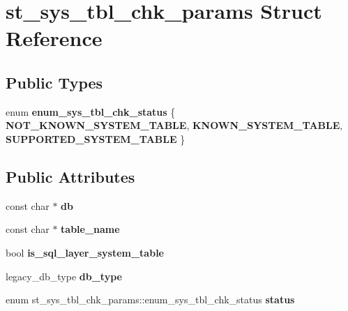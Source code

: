 \hypertarget{structst__sys__tbl__chk__params}{}\section{st\+\_\+sys\+\_\+tbl\+\_\+chk\+\_\+params Struct Reference}
\label{structst__sys__tbl__chk__params}
\subsection*{Public Types}
\begin{DoxyCompactItemize}
\item 
\mbox{\label{structst__sys__tbl__chk__params_a12daaf44c5b629c37691aa6ca2d1e109}} 
enum {\bfseries enum\+\_\+sys\+\_\+tbl\+\_\+chk\+\_\+status} \{ {\bfseries N\+O\+T\+\_\+\+K\+N\+O\+W\+N\+\_\+\+S\+Y\+S\+T\+E\+M\+\_\+\+T\+A\+B\+LE}, 
{\bfseries K\+N\+O\+W\+N\+\_\+\+S\+Y\+S\+T\+E\+M\+\_\+\+T\+A\+B\+LE}, 
{\bfseries S\+U\+P\+P\+O\+R\+T\+E\+D\+\_\+\+S\+Y\+S\+T\+E\+M\+\_\+\+T\+A\+B\+LE}
 \}
\end{DoxyCompactItemize}
\subsection*{Public Attributes}
\begin{DoxyCompactItemize}
\item 
\mbox{\label{structst__sys__tbl__chk__params_aec5571d50b9813c86d9222cdeb73d048}} 
const char $\ast$ {\bfseries db}
\item 
\mbox{\label{structst__sys__tbl__chk__params_abd1faff6ef4623bf91d1d609744c16ea}} 
const char $\ast$ {\bfseries table\+\_\+name}
\item 
\mbox{\label{structst__sys__tbl__chk__params_aa89b561ab2c03f1ad8ac9d52967844b0}} 
bool {\bfseries is\+\_\+sql\+\_\+layer\+\_\+system\+\_\+table}
\item 
\mbox{\label{structst__sys__tbl__chk__params_a06006543af503bc8df162f78ae4680b2}} 
legacy\+\_\+db\+\_\+type {\bfseries db\+\_\+type}
\item 
\mbox{\label{structst__sys__tbl__chk__params_adc64635041de5ae38ff472c507dc6ed0}} 
enum st\+\_\+sys\+\_\+tbl\+\_\+chk\+\_\+params\+::enum\+\_\+sys\+\_\+tbl\+\_\+chk\+\_\+status {\bfseries status}
\end{DoxyCompactItemize}


